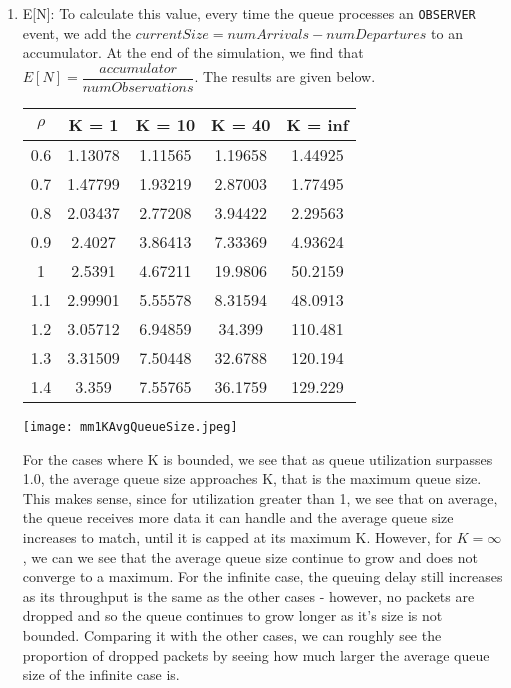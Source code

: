 \documentclass{article}
\begin{document}
\begin{enumerate}
    \item E[N]: To calculate this value, every time the queue processes an \texttt{OBSERVER} event, we add the $currentSize = numArrivals - numDepartures$
    to an accumulator. At the end of the simulation, we find that $E[N] = \dfrac{accumulator}{numObservations}$. The results are given below. \newline
    \begin{center}
        \begin{tabular}{||c c c c c||}
        \hline
        $\rho$ & K = 1 & K = 10 & K = 40 & K = inf \\ [0.5ex]
        \hline\hline
        0.6 & 1.13078 & 1.11565 & 1.19658 & 1.44925 \\
        \hline
        0.7 & 1.47799 & 1.93219 & 2.87003 & 1.77495 \\
        \hline
        0.8 & 2.03437 & 2.77208 & 3.94422 & 2.29563 \\
        \hline
        0.9 & 2.4027 & 3.86413 & 7.33369 & 4.93624 \\
        \hline
        1 & 2.5391 & 4.67211 & 19.9806 & 50.2159 \\
        \hline
        1.1 & 2.99901 & 5.55578 & 8.31594 & 48.0913 \\
        \hline
        1.2 & 3.05712 & 6.94859 & 34.399 & 110.481 \\
        \hline
        1.3 & 3.31509 & 7.50448 & 32.6788 & 120.194 \\
        \hline
        1.4 & 3.359 & 7.55765 & 36.1759 & 129.229 \\
        \hline
        \end{tabular}
    \end{center}
    \texttt{[image: mm1KAvgQueueSize.jpeg]}

    For the cases where K is bounded, we see that as queue utilization surpasses 1.0, the average queue size approaches K, that is the maximum queue size.
    This makes sense, since for utilization greater than 1, we see that on average, the queue receives more data it can handle and the average queue size increases
    to match, until it is capped at its maximum K. However, for $K=\infty$, we can we see that the average queue size continue to grow and does not converge to a
    maximum. For the infinite case, the queuing delay still increases as its throughput is the same as the other cases - however, no packets are dropped and so the queue
    continues to grow longer as it's size is not bounded. Comparing it with the other cases, we can roughly see the proportion of dropped packets by seeing how much
    larger the average queue size of the infinite case is.


\end{enumerate}
\end{document}

